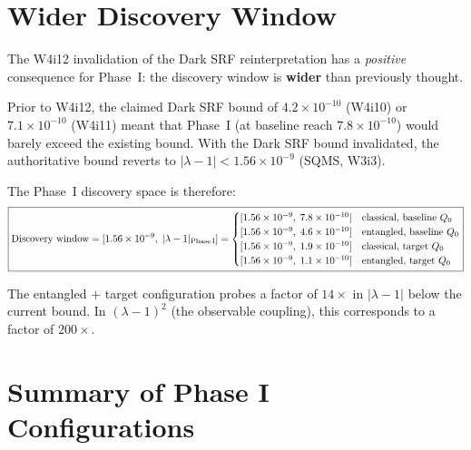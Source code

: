 \documentclass[11pt]{article}
\newcommand{\lam}{\lambda}
\newcommand{\ee}[1]{\times 10^{#1}}
\newcommand{\lbone}{|\lam - 1|}
\theoremstyle{definition}
\theoremstyle{remark}
\begin{document}
\section{Wider Discovery Window}
\label{sec:window}

The W4i12 invalidation of the Dark SRF reinterpretation has a
\emph{positive} consequence for Phase~I: the discovery window is
\textbf{wider} than previously thought.

Prior to W4i12, the claimed Dark SRF bound of $4.2\ee{-10}$ (W4i10)
or $7.1\ee{-10}$ (W4i11) meant that Phase~I (at baseline reach
$7.8\ee{-10}$) would barely exceed the existing bound. With the Dark
SRF bound invalidated, the authoritative bound reverts to
$\lbone < 1.56\ee{-9}$ (SQMS, W3i3).

The Phase~I discovery space is therefore:
\begin{equation}
\boxed{
\text{Discovery window} = [1.56\ee{-9},\; \lbone_{\rm Phase\,I}]
= \begin{cases}
[1.56\ee{-9},\; 7.8\ee{-10}] & \text{classical, baseline $Q_0$} \\
[1.56\ee{-9},\; 4.6\ee{-10}] & \text{entangled, baseline $Q_0$} \\
[1.56\ee{-9},\; 1.9\ee{-10}] & \text{classical, target $Q_0$} \\
[1.56\ee{-9},\; 1.1\ee{-10}] & \text{entangled, target $Q_0$}
\end{cases}
}
\label{eq:discovery_window}
\end{equation}

The entangled + target configuration probes a factor of $14\times$ in
$\lbone$ below the current bound. In $(\lam-1)^2$ (the observable
coupling), this corresponds to a factor of $200\times$.


\section{Summary of Phase I Configurations}
\label{sec:phase_I_summary}
\end{document}
